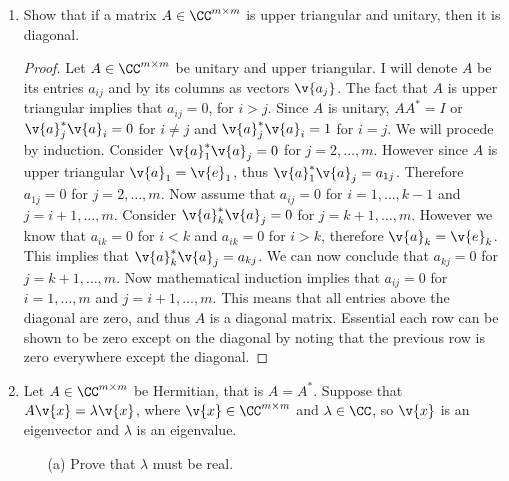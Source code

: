 \documentclass[11pt]{article}
\begin{document}
\begin{enumerate}
\begin{enumerate}
        \end{enumerate}

    \item %
        Show that if a matrix $A \in \CC^{m \times m}$ is upper triangular and
        unitary, then it is diagonal.

        \begin{proof}
            Let $A \in \CC^{m \times m}$ be unitary and upper triangular.
            I will denote $A$ be its entries $a_{ij}$ and by its columns as
            vectors $\v{a_j}$.
            The fact that $A$ is upper triangular implies that $a_{ij} = 0$,
            for $i > j$.
            Since $A$ is unitary, $AA^* = I$ or $\v{a}_j^*\v{a}_i = 0$ for
            $i \neq j$ and $\v{a}_j^*\v{a}_i = 1$ for $i = j$.
            We will procede by induction. 
            Consider $\v{a}_1^*\v{a}_j = 0$ for $j = 2, \ldots, m$.
            However since $A$ is upper triangular $\v{a}_1 = \v{e}_1$, thus
            $\v{a}_1^*\v{a}_j = a_{1j}$.
            Therefore $a_{1j} = 0$ for $j = 2, \ldots, m$.
            Now assume that $a_{ij} = 0$ for $i = 1, \ldots, k - 1$ and
            $j = i + 1, \ldots, m$.
            Consider $\v{a}_k^* \v{a}_j = 0$ for $j = k+1, \ldots, m$.
            However we know that $a_{ik} = 0$ for $i < k$ and $a_{ik} = 0$ for
            $i > k$, therefore $\v{a}_k = \v{e}_k$.
            This implies that $\v{a}_k^* \v{a}_j = a_{kj}$.
            We can now conclude that $a_{kj} = 0$ for $j = k+1, \ldots, m$.
            Now mathematical induction implies that $a_{ij} = 0$ for
            $i = 1, \ldots, m$ and $j = i+1, \ldots, m$.
            This means that all entries above the diagonal are zero, and thus
            $A$ is a diagonal matrix.
            Essential each row can be shown to be zero except on the diagonal
            by noting that the previous row is zero everywhere except the
            diagonal.
        \end{proof}

    \item %
        Let $A \in \CC^{m \times m}$ be Hermitian, that is $A = A^*$.
        Suppose that $A\v{x} = \lambda\v{x}$, where $\v{x} \in \CC^{m \times m}$
        and $\lambda \in \CC$, so $\v{x}$ is an eigenvector and $\lambda$ is an
        eigenvalue.
        \begin{enumerate}
            \item[(a)]
                Prove that $\lambda$ must be real.


\end{enumerate}
\end{enumerate}
\end{document}
